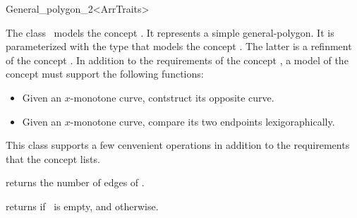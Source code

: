 \ccRefPageBegin

\begin{ccRefClass}{General_polygon_2<ArrTraits>}

\ccThreeToTwo

\ccDefinition
The class \ccRefName\ models the concept .
It represents a simple general-polygon. It is parameterized with the type
 that models the concept
. The latter is a refinment
of the concept . In addition to the
requirements of the concept , a
model of the concept  must
support the following functions:
\begin{itemize}
\item Given an $x$-monotone curve, contstruct its opposite curve.
\item Given an $x$-monotone curve, compare its two endpoints lexigoraphically.
\end{itemize} 

This class supports a few cenvenient operations in addition to the 
requirements that the concept  lists.

 
\ccTypes



\ccCreation
{}

% 
% 

\ccOperations
 {returns the number of edges of \ccVar.}

\ccModifiers


\ccPredicates
{returns  if \ccVar\ is empty, and  otherwise.}



\ccIsModel

\end{ccRefClass}
\ccRefPageEnd
